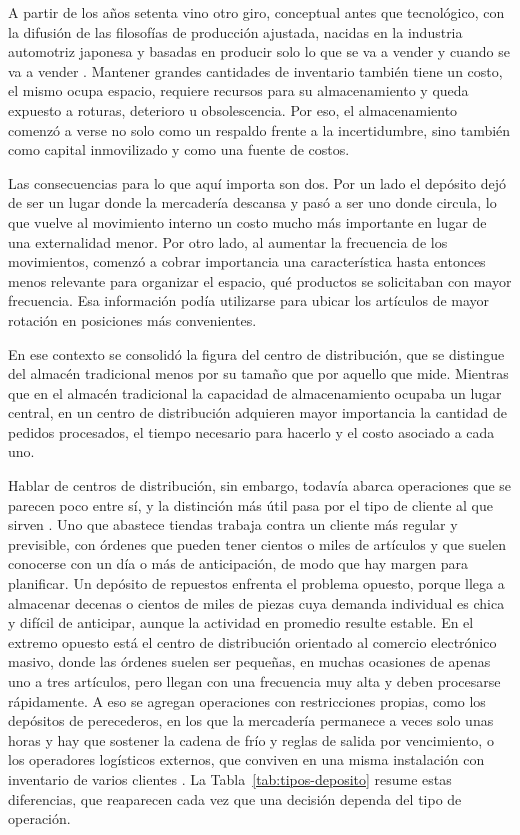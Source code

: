 A partir de los años setenta vino otro giro, conceptual antes que tecnológico, con la difusión de las filosofías de producción ajustada, nacidas en la industria automotriz japonesa y basadas en producir solo lo que se va a vender y cuando se va a vender \citep{womack1990machine}.
Mantener grandes cantidades de inventario también tiene un costo, el mismo ocupa espacio, requiere recursos para su almacenamiento y queda expuesto a roturas, deterioro u obsolescencia. Por eso, el almacenamiento comenzó a verse no solo como un respaldo frente a la incertidumbre, sino también como capital inmovilizado y como una fuente de costos.

Las consecuencias para lo que aquí importa son dos.
Por un lado el depósito dejó de ser un lugar donde la mercadería descansa y pasó a ser uno donde circula, lo que vuelve al movimiento interno un costo mucho más importante en lugar de una externalidad menor.
Por otro lado, al aumentar la frecuencia de los movimientos, comenzó a cobrar importancia una característica hasta entonces menos relevante para organizar el espacio, qué productos se solicitaban con mayor frecuencia. Esa información podía utilizarse para ubicar los artículos de mayor rotación en posiciones más convenientes.

En ese contexto se consolidó la figura del centro de distribución, que se distingue del almacén tradicional menos por su tamaño que por aquello que mide.
Mientras que en el almacén tradicional la capacidad de almacenamiento ocupaba un lugar central, en un centro de distribución adquieren mayor importancia la cantidad de pedidos procesados, el tiempo necesario para hacerlo y el costo asociado a cada uno.

Hablar de centros de distribución, sin embargo, todavía abarca operaciones que se parecen poco entre sí, y la distinción más útil pasa por el tipo de cliente al que sirven \citep[sección~1.2]{bartholdi2014warehouse}.
Uno que abastece tiendas trabaja contra un cliente más regular y previsible, con órdenes que pueden tener cientos o miles de artículos y que suelen conocerse con un día o más de anticipación, de modo que hay margen para planificar.
Un depósito de repuestos enfrenta el problema opuesto, porque llega a almacenar decenas o cientos de miles de piezas cuya demanda individual es chica y difícil de anticipar, aunque la actividad en promedio resulte estable.
En el extremo opuesto está el centro de distribución orientado al comercio electrónico masivo, donde las órdenes suelen ser pequeñas, en muchas ocasiones de apenas uno a tres artículos, pero llegan con una frecuencia muy alta y deben procesarse rápidamente.
A eso se agregan operaciones con restricciones propias, como los depósitos de perecederos, en los que la mercadería permanece a veces solo unas horas y hay que sostener la cadena de frío y reglas de salida por vencimiento, o los operadores logísticos externos, que conviven en una misma instalación con inventario de varios clientes \citep[sección~1.2]{bartholdi2014warehouse}.
La Tabla~\ref{tab:tipos-deposito} resume estas diferencias, que reaparecen cada vez que una decisión dependa del tipo de operación.


